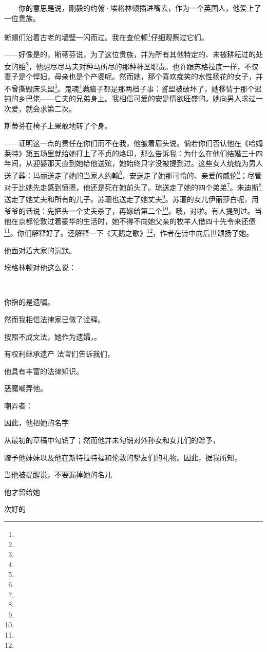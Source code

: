 \par ——你的意思是说，刚毅的约翰·埃格林顿插进嘴去，作为一个英国人，他爱上了一位贵族。
\par 蜥蜴们沿着古老的墙壁一闪而过。我在查伦顿\footnote{}仔细观察过它们。
\par ——好像是的，斯蒂芬说，为了这位贵族，并为所有其他特定的、未被耕耘过的处女的胎\footnote{}，他想尽尽马夫对种马所尽的那种神圣职责。也许跟苏格拉底一样，不仅妻子是个悍妇，母亲也是个产婆呢。然而她，那个喜欢痴笑的水性杨花的女子，并不曾撕毁床头盟\footnote{}。鬼魂\footnote{}满脑子都是那两档子事：誓盟被破坏了，她移情于那个迟钝的乡巴佬——亡夫的兄弟身上。我相信可爱的安是情欲旺盛的。她向男人求过一次爱，就会求第二次。
\par 斯蒂芬在椅子上果敢地转了个身。
\par ——证明这一点的责任在你们而不在我，他皱着眉头说。倘若你们否认他在《哈姆莱特》第五场里就给她打上了不贞的烙印，那么告诉我：为什么在他们结婚三十四年间，从迎娶那天直到她给他送殡，她始终只字没被提到过。这些女人统统为男人送了葬：玛丽送走了她的当家人约翰\footnote{}，安送走了她那可怜的、亲爱的威伦\footnote{}；尽管对于比她先走感到愤懑，他还是死在她前头了。琼送走了她的四个弟弟\footnote{}。朱迪斯\footnote{}送走了她丈夫和所有的儿子。苏珊也送走了她丈夫\footnote{}。苏珊的女儿伊丽莎白呢，用爷爷的话说：先把头一个丈夫杀了，再嫁给第二个\footnote{}。哦，对啦。有人提到过。当他在京都伦敦过着豪华的生活时，她不得不向她父亲的牧羊人借四十先令来还债\footnote{}。你们解释好了。还解释一下《天鹅之歌》\footnote{}，作者在诗中向后世颂扬了她。
\par 他面对着大家的沉默。
\par 埃格林顿对他这么说：
\par  
\par 你指的是遗嘱。
\par 然而我相信法律家已做了诠释。
\par 按照不成文法，她作为遗孀，。
\par 有权利继承遗产 法官们告诉我们，
\par 他具有丰富的法律知识。
\par 恶魔嘲弄他。
\par 嘲弄者：
\par 因此，他把她的名字
\par 从最初的草稿中勾销了；然而他并未勾销对外孙女和女儿们的赠予，
\par 赠予他妹妹以及他在斯特拉特福和伦敦的挚友们的礼物。因此，据我所知，
\par 当他被提醒说，不要漏掉她的名儿
\par 他才留给她
\par 次好的

